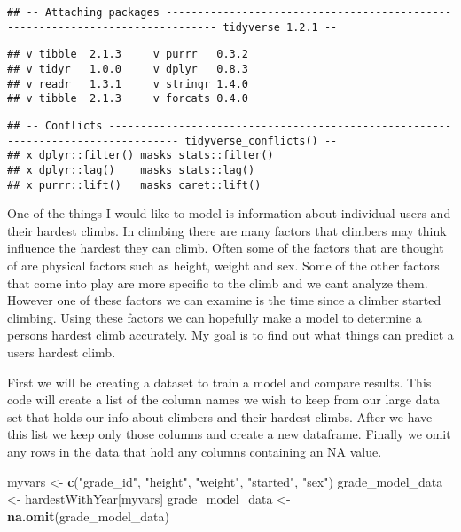 \documentclass[]{article}
\newenvironment{Shaded}{\begin{snugshade}}{\end{snugshade}}
\newcommand{\KeywordTok}[1]{\textcolor[rgb]{0.13,0.29,0.53}{\textbf{#1}}}
\newcommand{\NormalTok}[1]{#1}
\newcommand{\StringTok}[1]{\textcolor[rgb]{0.31,0.60,0.02}{#1}}
\begin{document}
\begin{verbatim}
## -- Attaching packages ------------------------------------------------------------------------------ tidyverse 1.2.1 --
\end{verbatim}

\begin{verbatim}
## v tibble  2.1.3     v purrr   0.3.2
## v tidyr   1.0.0     v dplyr   0.8.3
## v readr   1.3.1     v stringr 1.4.0
## v tibble  2.1.3     v forcats 0.4.0
\end{verbatim}

\begin{verbatim}
## -- Conflicts --------------------------------------------------------------------------------- tidyverse_conflicts() --
## x dplyr::filter() masks stats::filter()
## x dplyr::lag()    masks stats::lag()
## x purrr::lift()   masks caret::lift()
\end{verbatim}

One of the things I would like to model is information about individual
users and their hardest climbs. In climbing there are many factors that
climbers may think influence the hardest they can climb. Often some of
the factors that are thought of are physical factors such as height,
weight and sex. Some of the other factors that come into play are more
specific to the climb and we cant analyze them. However one of these
factors we can examine is the time since a climber started climbing.
Using these factors we can hopefully make a model to determine a persons
hardest climb accurately. My goal is to find out what things can predict
a users hardest climb.

First we will be creating a dataset to train a model and compare
results. This code will create a list of the column names we wish to
keep from our large data set that holds our info about climbers and
their hardest climbs. After we have this list we keep only those columns
and create a new dataframe. Finally we omit any rows in the data that
hold any columns containing an NA value.

\begin{Shaded}
\begin{Highlighting}[]
\NormalTok{myvars <-}\StringTok{ }\KeywordTok{c}\NormalTok{(}\StringTok{"grade_id"}\NormalTok{, }\StringTok{"height"}\NormalTok{, }\StringTok{"weight"}\NormalTok{, }\StringTok{"started"}\NormalTok{, }\StringTok{"sex"}\NormalTok{)}
\NormalTok{grade_model_data <-}\StringTok{ }\NormalTok{hardestWithYear[myvars]}
\NormalTok{grade_model_data <-}\StringTok{ }\KeywordTok{na.omit}\NormalTok{(grade_model_data)}
\end{Highlighting}
\end{Shaded}
\end{document}
